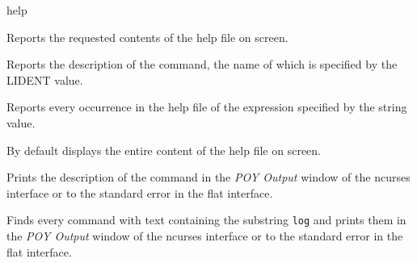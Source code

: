 \begin{command}{help}{}

	
	\begin{poydescription}
         Reports the requested contents of the help file on screen.
	\end{poydescription}
	
	\begin{arguments}
            {Reports the description of the command, the name of which is specified by the
            LIDENT value.}
            {}

            {Reports every occurrence in the help file of the expression specified by the string value.}
            {}
	\end{arguments}
	
	\poydefaults{}
        {By default \poy displays the entire content of the help file on screen.}
        
	\begin{poyexamples}
            {Prints the description of the command
             in the \emph{POY Output} window of the ncurses
            interface or to the standard error in the flat interface.}

            {Finds every command with text containing the substring \texttt{log} and
            prints them in the \emph{POY Output} window of the ncurses
            interface or to the standard error in the flat interface.}

	\end{poyexamples}

\end{command}


